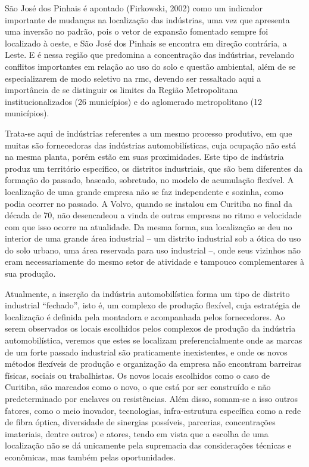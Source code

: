 	São José dos Pinhais é apontado (Firkowski, 2002) como um indicador importante de mudanças na localização das indústrias, uma vez que apresenta uma inversão no padrão, pois o vetor de expansão fomentado sempre foi localizado à oeste, e São José dos Pinhais se encontra em direção contrária, a Leste. E é nessa região que predomina a concentração das indústrias, revelando conflitos importantes em relação ao uso do solo e questão ambiental, além de se especializarem de modo seletivo na \gls{rmc}, devendo ser ressaltado aqui a importância de se distinguir os limites da Região Metropolitana institucionalizados (26 municípios) e do aglomerado metropolitano (12 municípios). 
	
	Trata-se aqui de indústrias referentes a um mesmo processo produtivo, em que muitas são fornecedoras das indústrias automobilísticas, cuja ocupação não está na mesma planta, porém estão em suas proximidades. Este tipo de indústria produz um território específico, os distritos industriais, que são bem diferentes da formação do passado, baseado, sobretudo, no modelo de acumulação flexível. A localização de uma grande empresa não se faz independente e sozinha, como podia ocorrer no passado. A Volvo, quando se instalou em Curitiba no final da década de 70, não desencadeou a vinda de outras empresas no ritmo e velocidade com que isso ocorre na atualidade. Da mesma forma, sua localização se deu no interior de uma grande área industrial – um distrito industrial sob a ótica do uso do solo urbano, uma área reservada para uso industrial –, onde seus vizinhos não eram necessariamente do mesmo setor de atividade e tampouco complementares à sua produção.
	
	Atualmente, a inserção da indústria automobilística forma um tipo de distrito industrial ``fechado'', isto é, um complexo de produção flexível, cuja estratégia de localização é definida pela montadora e acompanhada pelos fornecedores. Ao serem observados os locais escolhidos pelos complexos de produção da indústria automobilística, veremos que estes se localizam preferencialmente onde as marcas de um forte passado industrial são praticamente inexistentes, e onde os novos métodos flexíveis de produção e organização da empresa não encontram barreiras físicas, sociais ou trabalhistas. Os novos locais escolhidos como o caso de Curitiba, são marcados como o novo, o que está por ser construído e não predeterminado por enclaves ou resistências. Além disso, somam-se a isso outros fatores, como o meio inovador, tecnologias, infra-estrutura específica como a rede de fibra óptica, diversidade de sinergias possíveis, parcerias, concentrações imateriais, dentre outros) e atores, tendo em vista que a escolha de uma localização não se dá unicamente pela supremacia das considerações técnicas e econômicas, mas também pelas oportunidades. 
	

